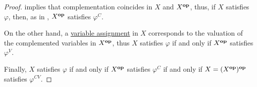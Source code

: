 \begin{proof}
   implies that complementation coincides in \( X \) and \( X^\oppos \), thus, if \( X \) satisfies \( \varphi \), then, as in , \( X^\oppos \) satisfies \( \varphi^C \).

  On the other hand, a \hyperref[def:first_order_valuation/variable_assignment]{variable assignment} in \( X \) corresponds to the valuation of the complemented variables in \( X^\oppos \), thus \( X \) satisfies \( \varphi \) if and only if \( X^\oppos \) satisfies \( \varphi^V \).

  Finally, \( X \) satisfies \( \varphi \) if and only if \( X^\oppos \) satisfies \( \varphi^C \) if and only if \( X = (X^\oppos)^\oppos \) satisfies \( \varphi^{CV} \).
\end{proof}

